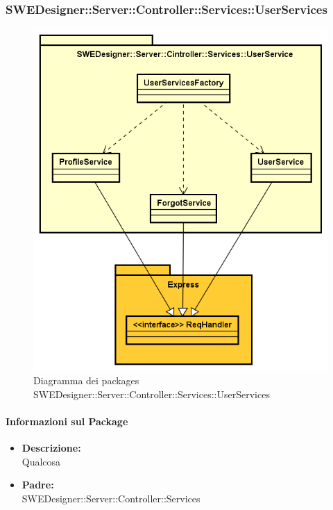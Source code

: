 		\subsubsection{SWEDesigner::Server::Controller::Services::UserServices}
		\begin{figure}[h!]
		\centering
		\includegraphics[scale=0.4]{Disegnetti/SWEDesigner__Server__Controller__Services__UserService.png}
		\caption{Diagramma dei packages SWEDesigner::Server::Controller::Services::UserServices}
 		\end{figure}		
		\paragraph{Informazioni sul Package}
		\begin{itemize}				
			\item \textbf{Descrizione: }\\
			Qualcosa
			\item \textbf{Padre: }\\ SWEDesigner::Server::Controller::Services
			
		\end{itemize}
